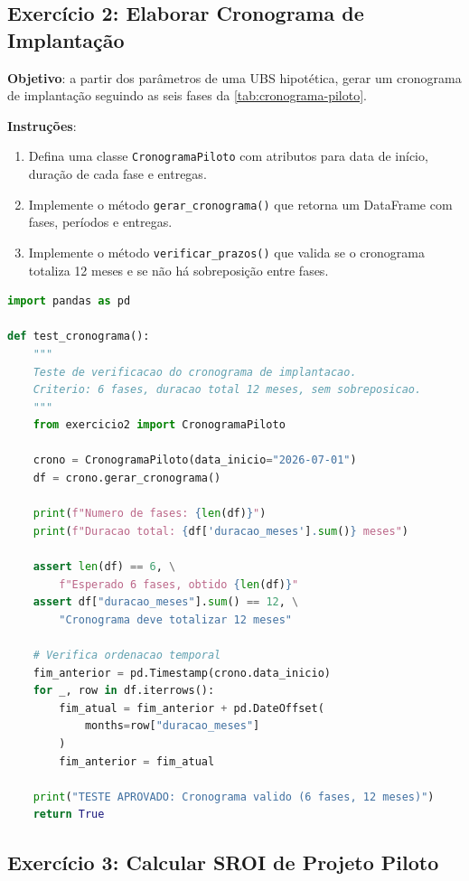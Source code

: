 \subsection*{Exercício 2: Elaborar Cronograma de Implantação}

\textbf{Objetivo}: a partir dos parâmetros de uma UBS hipotética,
gerar um cronograma de implantação seguindo as seis fases da
\autoref{tab:cronograma-piloto}.

\textbf{Instruções}:
\begin{enumerate}
    \item Defina uma classe \texttt{CronogramaPiloto} com atributos
        para data de início, duração de cada fase e entregas.
    \item Implemente o método \texttt{gerar\_cronograma()} que retorna
        um DataFrame com fases, períodos e entregas.
    \item Implemente o método \texttt{verificar\_prazos()} que valida
        se o cronograma totaliza 12 meses e se não há sobreposição
        entre fases.
\end{enumerate}

\begin{lstlisting}[language=Python, caption={Teste TDD para cronograma de implantação (Exercício 2)}, label={lst:ex2_test}]
import pandas as pd

def test_cronograma():
    """
    Teste de verificacao do cronograma de implantacao.
    Criterio: 6 fases, duracao total 12 meses, sem sobreposicao.
    """
    from exercicio2 import CronogramaPiloto

    crono = CronogramaPiloto(data_inicio="2026-07-01")
    df = crono.gerar_cronograma()

    print(f"Numero de fases: {len(df)}")
    print(f"Duracao total: {df['duracao_meses'].sum()} meses")

    assert len(df) == 6, \
        f"Esperado 6 fases, obtido {len(df)}"
    assert df["duracao_meses"].sum() == 12, \
        "Cronograma deve totalizar 12 meses"

    # Verifica ordenacao temporal
    fim_anterior = pd.Timestamp(crono.data_inicio)
    for _, row in df.iterrows():
        fim_atual = fim_anterior + pd.DateOffset(
            months=row["duracao_meses"]
        )
        fim_anterior = fim_atual

    print("TESTE APROVADO: Cronograma valido (6 fases, 12 meses)")
    return True
\end{lstlisting}

\subsection*{Exercício 3: Calcular SROI de Projeto Piloto}


